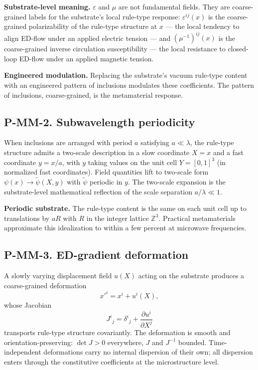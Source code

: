 \documentclass[11pt,a4paper]{article}
\begin{document}
\textbf{Substrate-level meaning.} $\varepsilon$ and $\mu$ are not fundamental fields. They are coarse-grained labels for the substrate's local rule-type response: $\varepsilon^{ij}(x)$ is the coarse-grained polarizability of the rule-type structure at $x$ --- the local tendency to align ED-flow under an applied electric tension --- and $(\mu^{-1})^{ij}(x)$ is the coarse-grained inverse circulation susceptibility --- the local resistance to closed-loop ED-flow under an applied magnetic tension.

\textbf{Engineered modulation.} Replacing the substrate's vacuum rule-type content with an engineered pattern of inclusions modulates these coefficients. The pattern of inclusions, coarse-grained, is the metamaterial response.

\subsection{P-MM-2. Subwavelength periodicity}

When inclusions are arranged with period $a$ satisfying $a \ll \lambda$, the rule-type structure admits a two-scale description in a slow coordinate $X = x$ and a fast coordinate $y = x/a$, with $y$ taking values on the unit cell $Y = [0, 1]^3$ (in normalized fast coordinates). Field quantities lift to two-scale form $\psi(x) \to \tilde\psi(X, y)$ with $\tilde\psi$ periodic in $y$. The two-scale expansion is the substrate-level mathematical reflection of the scale separation $a/\lambda \ll 1$.

\textbf{Periodic substrate.} The rule-type content is the same on each unit cell up to translations by $aR$ with $R$ in the integer lattice $\mathbb{Z}^3$. Practical metamaterials approximate this idealization to within a few percent at microwave frequencies.

\subsection{P-MM-3. ED-gradient deformation}

A slowly varying displacement field $u(X)$ acting on the substrate produces a coarse-grained deformation
\[
x'^i = x^i + u^i(X),
\]
whose Jacobian
\[
J^i{}_j = \delta^i{}_j + \frac{\partial u^i}{\partial X^j}
\]
transports rule-type structure covariantly. The deformation is smooth and orientation-preserving: $\det J > 0$ everywhere, $J$ and $J^{-1}$ bounded. Time-independent deformations carry no internal dispersion of their own; all dispersion enters through the constitutive coefficients at the microstructure level.
\end{document}
